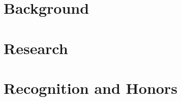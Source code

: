 \documentclass[fontsize=12pt]{article}
\begin{document}
\importdata

\tableofcontents

\section{Background}




\section{Research}




\section{Recognition and Honors}


\end{document}
